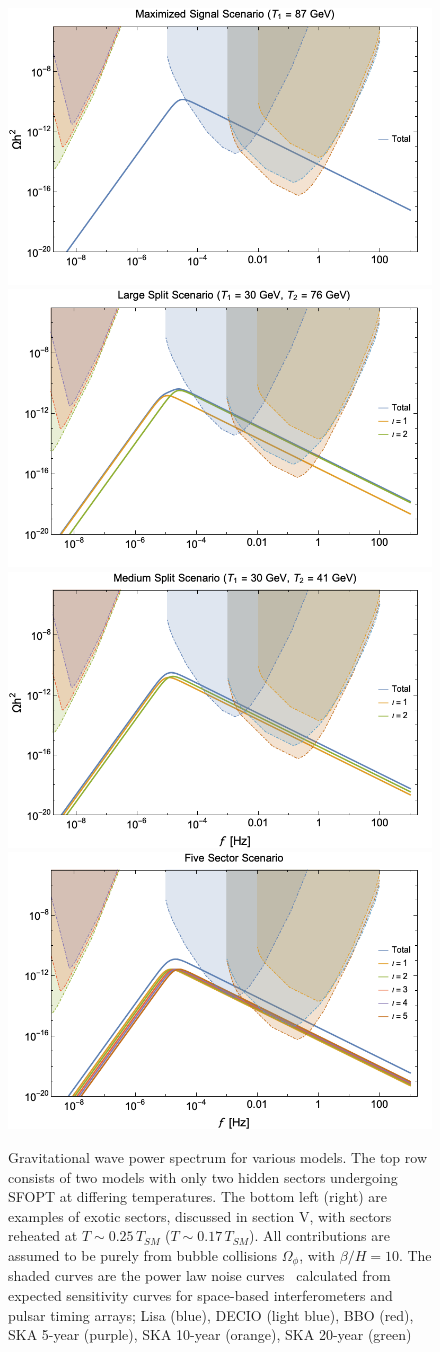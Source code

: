 \documentclass[nofootinbib,twocolumn,preprintnumbers]{revtex4-1}
\begin{document}
\begin{figure}[tb]
\centering
\begin{minipage}[c]{\textwidth}
\includegraphics[width=.45\textwidth ]{highest.png}
\hfill
\includegraphics[width=.45\textwidth]{TwoFar.png} 
\hfill
\includegraphics[width=.45\textwidth]{TwoMed.png} 
\hfill
\includegraphics[width=.45\textwidth]{energydensity.png} 
\end{minipage}
\hfill
\caption{ Gravitational wave power spectrum for various models. The top row consists of two models with only two hidden sectors undergoing SFOPT at differing temperatures. The bottom left (right) are examples of exotic sectors, discussed in section V, with sectors reheated at $T \sim 0.25\,T_{SM}$ ($T \sim 0.17\,T_{SM}$). All contributions are assumed to be purely from bubble collisions $\Omega_{\phi}$, with $\beta/H  = 10$.  The shaded curves are the power law noise curves~\cite{PhysRevD.88.124032} calculated from expected sensitivity curves for space-based interferometers and pulsar timing arrays; Lisa (blue), DECIO (light blue), BBO (red), SKA 5-year (purple), SKA 10-year (orange), SKA 20-year (green)   }
\label{fig:Haa}
\end{figure}
\end{document}
